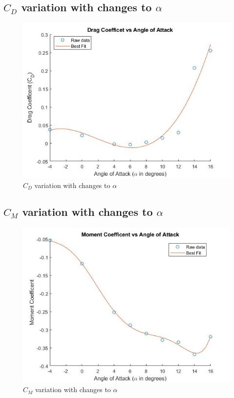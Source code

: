 \documentclass[12pt]{article}
\begin{document}
            \newpage
    \subsection{\(C_D\) variation with changes to \(\alpha\)}
    \begin{figure}[h]
        \includegraphics[width=16 cm]{Cd.jpg}
        \centering
        \caption{\(C_D\) variation with changes to \(\alpha\)}
    \end{figure}

            \newpage
    \subsection{\(C_M\) variation with changes to \(\alpha\)}
    \begin{figure}[h]
        \includegraphics[width=16 cm]{Cm.jpg}
        \centering
        \caption{\(C_M\) variation with changes to \(\alpha\)}
    \end{figure}
    \newpage
\end{document}
